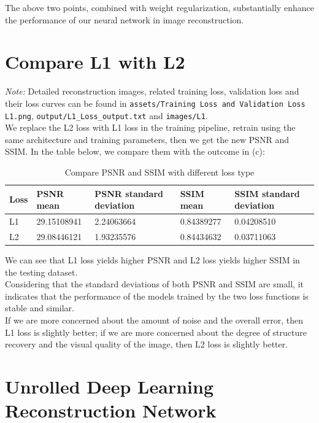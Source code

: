 \documentclass{article}
\begin{document}
The above two points, combined with weight regularization, substantially enhance the 
performance of our neural network in image reconstruction.



\section{Compare L1 with L2}
\textit{Note: }Detailed reconstruction images, related training loss, validation loss and their
 loss curves can be found in \texttt{assets/Training Loss and Validation Loss L1.png}, 
 \texttt{output/L1\_Loss\_output.txt} and \texttt{images/L1}.\\
We replace the L2 loss with L1 loss in the training pipeline, retrain using the same architecture 
and training parameters, then we get the new PSNR and SSIM. In the table below, we compare them
with the outcome in (c):
\begin{table}[H]
  \caption{Compare PSNR and SSIM with different loss type}
  \centering
  \begin{tabular}{lllll}
    \toprule
    \cmidrule(r){1-2}
    Loss     & PSNR mean     & PSNR standard deviation & SSIM mean  & SSIM standard deviation \\
    \midrule
    L1 & 29.15108941  & 2.24063664  & 0.84389277 &  0.04208510  \\
    L2     & 29.08446121 & 1.93235576  & 0.84434632 & 0.03711063  \\
    \bottomrule
  \end{tabular}
\end{table}
We can see that L1 loss yields higher PSNR and L2 loss yields higher SSIM in the testing dataset.\\
Considering that the standard deviations of both PSNR and SSIM are small, it indicates that the 
performance of the models trained by the two loss functions is stable and similar.\\
If we are more concerned about the amount of noise and the overall error, then L1 loss is slightly better; 
if we are more concerned about the degree of structure recovery and the visual quality of the image, 
then L2 loss is slightly better.



\section{Unrolled Deep Learning Reconstruction Network}
\end{document}
